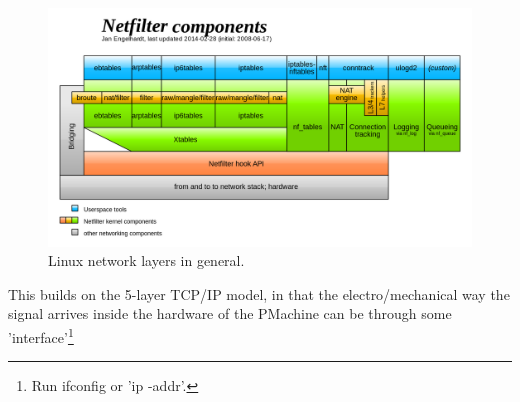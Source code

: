 \documentclass[letter,11pt,oneside]{article}
\begin{document}
\begin{figure}[h!]
\centering
\includegraphics[width=.75\textwidth]{images/1280px-Netfilter-components-svg.png}
\caption[Linux network overview]{Linux network layers in general.\;} 
\label{figure:netfilter}
\end{figure}

\clearpage

This builds on the 5-layer TCP/IP model, in that the electro/mechanical way
the signal arrives inside the hardware of the PMachine can be through
some 'interface'\footnote{Run ifconfig or 'ip -addr'.} 
\end{document}
